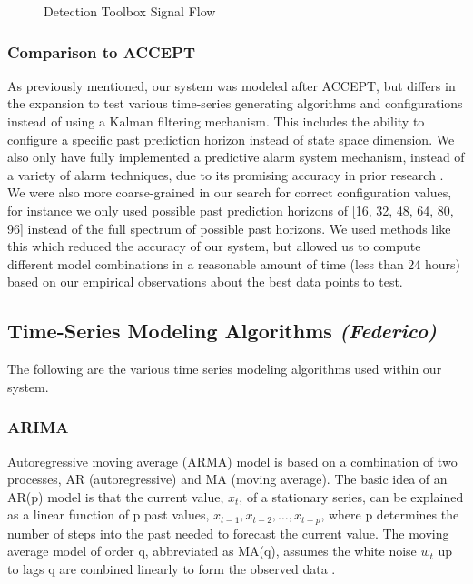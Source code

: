 \documentclass{acm_proc_article-sp}
\begin{document}
\begin{figure}[!h]
\centering
{}
\caption{Detection Toolbox Signal Flow}
\label{fig:DetectionSignal}
\end{figure}

\subsubsection{Comparison to ACCEPT}
As previously mentioned, our system was modeled after ACCEPT, but differs in the expansion to test various time-series generating algorithms and configurations instead of using a Kalman filtering mechanism. This includes the ability to configure a specific past prediction horizon instead of state space dimension. We also only have fully implemented a predictive alarm system mechanism, instead of a variety of alarm techniques, due to its promising accuracy in prior research \cite{Cornell}. We were also more coarse-grained in our search for correct configuration values, for instance we only used possible past prediction horizons of [16, 32, 48, 64, 80, 96] instead of the full spectrum of possible past horizons. We used methods like this which reduced the accuracy of our system, but allowed us to compute different model combinations in a reasonable amount of time (less than 24 hours) based on our empirical observations about the best data points to test. 

\newpage
\subsection{Time-Series Modeling Algorithms \textit{(Federico)}}
The following are the various time series modeling algorithms used within our system.

\subsubsection{ARIMA}

Autoregressive moving average (ARMA) model is based
on a combination of two processes, AR (autoregressive)
and MA (moving average). The basic idea of an AR(p)
model is that the current value, $x_t$, of a stationary series,
can be explained as a linear function of p past values,
$x_{t-1}, x_{t-2},…, x_{t-p}$, where p determines the number of
steps into the past needed to forecast the current value.
The moving average model of order q, abbreviated as
MA(q), assumes the white noise $w_t$ up to lags q are
combined linearly to form the observed data \cite{Kumar:arma}.
\end{document}
